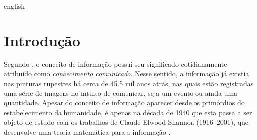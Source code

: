 \documentclass[11pt,oneside,brazil,hidelinks,article,sumario=tradicional,a4paper]{abntex2}
\renewcommand{\imprimircapa}{%
  \begin{capa}%
    \centering
    {\imprimirinstituicao\vfill}

    {\ABNTEXchapterfont\large\imprimirautor}

    \vfill
    {\ABNTEXchapterfont\bfseries\LARGE\imprimirtitulo}
    \vfill

    \large\imprimirlocal

    \large\imprimirdata

    \vspace*{15mm}
  \end{capa}
}
\begin{document}
\pretextual
\imprimircapa

\begin{resumo} %
  \vspace{\onelineskip}

  \noindent
\end{resumo}
\newpage


\begin{resumo}[Abstract] %
  \begin{otherlanguage*}{english}
    \vspace{\onelineskip}

    \noindent
  \end{otherlanguage*}
\end{resumo}
\newpage






\textual%

\section{Introdução}\label{sec:intro}


Segundo \textcite{conceitoinformação}, o conceito de informação possui seu significado cotidianamente atribuído como \textit{conhecimento comunicado}. Nesse sentido, a informação já existia nas pinturas rupestres há cerca de \num{45,5} mil anos atrás, nas quais estão registradas uma série de imagens no intuito de comunicar, seja um evento ou ainda uma quantidade. Apesar do conceito de informação aparecer desde os primórdios do estabelecimento da humanidade, é apenas na década de 1940 que esta passa a ser objeto de estudo com os trabalhos de Claude Elwood Shannon (1916--2001), que desenvolve uma teoria matemática para a informação \cite{CiênciaTransiçãoSeculosa}.
\end{document}
